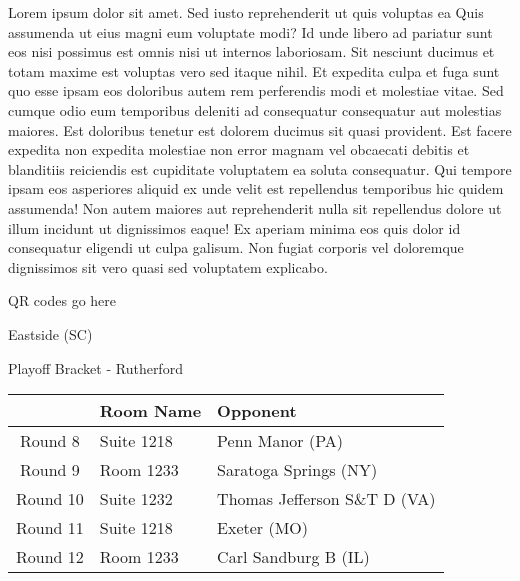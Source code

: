 \documentclass{article}%
\begin{document}
\vspace*{8pt}%
\linebreak%
\newline%
\newline%
Lorem ipsum dolor sit amet. Sed iusto reprehenderit ut quis voluptas ea Quis assumenda ut eius magni eum voluptate modi? Id unde libero ad pariatur sunt eos nisi possimus est omnis nisi ut internos laboriosam. Sit nesciunt ducimus et totam maxime est voluptas vero sed itaque nihil. Et expedita culpa et fuga sunt quo esse ipsam eos doloribus autem rem perferendis modi et molestiae vitae.\newline%
\newline%
Sed cumque odio eum temporibus deleniti ad consequatur consequatur aut molestias maiores. Est doloribus tenetur est dolorem ducimus sit quasi provident. Est facere expedita non expedita molestiae non error magnam vel obcaecati debitis et blanditiis reiciendis est cupiditate voluptatem ea soluta consequatur. Qui tempore ipsam eos asperiores aliquid ex unde velit est repellendus temporibus hic quidem assumenda!\newline%
\newline%
Non autem maiores aut reprehenderit nulla sit repellendus dolore ut illum incidunt ut dignissimos eaque! Ex aperiam minima eos quis dolor id consequatur eligendi ut culpa galisum. Non fugiat corporis vel doloremque dignissimos sit vero quasi sed voluptatem explicabo.\newline%
\newline%
%
\vspace*{30pt}%
\begin{center}%
\begin{Huge}%
QR codes go here%
\end{Huge}%
\end{center}%
\newpage%
\begin{center}%
\begin{Huge}%
Eastside (SC)%
\end{Huge}%
\vspace*{8pt}%
\linebreak%
\begin{Large}%
Playoff Bracket {-} Rutherford%
\end{Large}%
\end{center}%
%
\begin{tabularx}{\textwidth}{|c|Y|Y|}%
\hline%
&Room Name&Opponent\\%
\hline%
Round 8&Suite 1218&Penn Manor (PA)\\%
Round 9&Room 1233&Saratoga Springs (NY)\\%
Round 10&Suite 1232&Thomas Jefferson S\&T D (VA)\\%
Round 11&Suite 1218&Exeter (MO)\\%
Round 12&Room 1233&Carl Sandburg B (IL)\\%
\hline%
\end{tabularx}%
\end{document}
